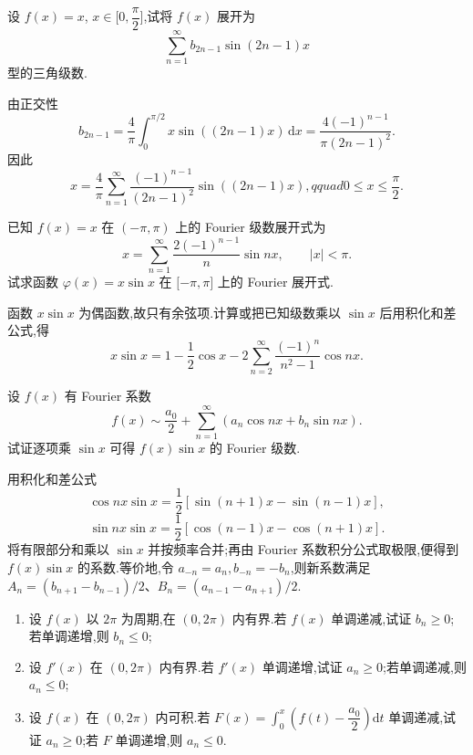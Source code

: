 \begin{example}
    设 $f(x)=x$, $x\in\lbrack 0,\dfrac{\pi}{2}\rbrack$,试将 $f(x)$ 展开为
    \[
        \sum\limits_{n=1}^{\infty}b_{2n-1}\sin(2n-1)x
    \]
    型的三角级数.
\end{example}
\exampleblank

\begin{solution}
    由正交性
    \[
        b_{2n-1}=\dfrac{4}{\pi}\int_0^{\pi/2}x\sin((2n-1)x)\,\mathrm{d}x
        =\dfrac{4(-1)^{n-1}}{\pi(2n-1)^2}.
    \]
    因此
    \[
        x=\dfrac{4}{\pi}\sum\limits_{n=1}^{\infty}
        \dfrac{(-1)^{n-1}}{(2n-1)^2}\sin((2n-1)x),qquad0\leq x\leq\dfrac{\pi}{2}.
    \]
\end{solution}

\begin{example}
    已知 $f(x)=x$ 在 $(-\pi,\pi)$ 上的 Fourier 级数展开式为
    \[
        x=\sum\limits_{n=1}^{\infty}\dfrac{2(-1)^{n-1}}{n}\sin nx,
        \qquad |x|<\pi.
    \]
    试求函数 $\varphi(x)=x\sin x$ 在 $\lbrack -\pi,\pi\rbrack$ 上的 Fourier 展开式.
\end{example}
\exampleblank

\begin{solution}
    函数 $x\sin x$ 为偶函数,故只有余弦项.计算或把已知级数乘以 $\sin x$ 后用积化和差公式,得
    \[
        x\sin x=1-\dfrac{1}{2}\cos x-
        2\sum\limits_{n=2}^{\infty}\dfrac{(-1)^n}{n^2-1}\cos nx.
    \]
\end{solution}

\begin{example}
    设 $f(x)$ 有 Fourier 系数
    \[
        f(x)\sim\dfrac{a_0}{2}+\sum\limits_{n=1}^{\infty}(a_n\cos nx+b_n\sin nx).
    \]
    试证逐项乘 $\sin x$ 可得 $f(x)\sin x$ 的 Fourier 级数.
\end{example}
\exampleblank

\begin{solution}
    用积化和差公式
    \[
        \cos nx\sin x=\dfrac{1}{2}[\sin(n+1)x-\sin(n-1)x],
    \]
    \[
        \sin nx\sin x=\dfrac{1}{2}[\cos(n-1)x-\cos(n+1)x].
    \]
    将有限部分和乘以 $\sin x$ 并按频率合并;再由 Fourier 系数积分公式取极限,便得到 $f(x)\sin x$ 的系数.等价地,令 $a_{-n}=a_n,b_{-n}=-b_n$,则新系数满足
    $A_n=(b_{n+1}-b_{n-1})/2$、$B_n=(a_{n-1}-a_{n+1})/2$.
\end{solution}

\begin{example}[\markstar]
    \begin{enumerate}
        \item 设 $f(x)$ 以 $2\pi$ 为周期,在 $(0,2\pi)$ 内有界.若 $f(x)$ 单调递减,试证 $b_n\geq0$;若单调递增,则 $b_n\leq0$;
        \item 设 $f'(x)$ 在 $(0,2\pi)$ 内有界.若 $f'(x)$ 单调递增,试证 $a_n\geq0$;若单调递减,则 $a_n\leq0$;
        \item 设 $f(x)$ 在 $(0,2\pi)$ 内可积.若 $F(x)=\displaystyle\int_0^x\left(f(t)-\dfrac{a_0}{2}\right)\mathrm{d}t$ 单调递减,试证 $a_n\geq0$;若 $F$ 单调递增,则 $a_n\leq0$.
    \end{enumerate}
\end{example}
\exampleblank

